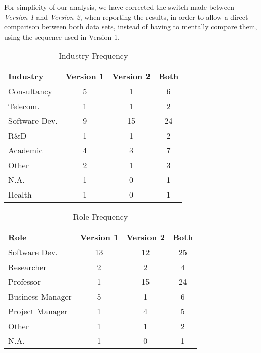 For simplicity of our analysis, we have corrected the switch made between \textit{Version 1} and \textit{Version 2}, when reporting the results, in order to allow a direct comparison between both data sets, instead of having to mentally compare them, using the sequence used in Version 1.

\begin{table}[htb]
	\centering
	\caption{Industry Frequency}
	\label{tab: industry}
	\begin{tabular}{l|c|c|c}
		\hline \bf Industry & \bf Version 1 & \bf Version 2 & \bf Both \\ \hline
		Consultancy         & 5             & 1             & 6        \\ \hline
		Telecom.            & 1             & 1             & 2        \\ \hline
		Software Dev.       & 9             & 15            & 24       \\ \hline
		R\&D                & 1             & 1             & 2        \\ \hline
		Academic            & 4             & 3             & 7        \\ \hline
		Other               & 2             & 1             & 3        \\ \hline
		N.A.                & 1             & 0             & 1        \\ \hline
		Health              & 1             & 0             & 1        \\ \hline
	\end{tabular}
\end{table}

\begin{table}[htb]
	\centering
	\caption{Role Frequency}
	\label{tab: roles}
	\begin{tabular}{l|c|c|c}
		\hline \bf Role  & \bf Version 1 & \bf Version 2 & \bf Both \\ \hline
		Software Dev.    & 13            & 12            & 25       \\ \hline
		Researcher       & 2             & 2             & 4        \\ \hline
		Professor        & 1             & 15            & 24       \\ \hline
		Business Manager & 5             & 1             & 6        \\ \hline
		Project Manager  & 1             & 4             & 5        \\ \hline
		Other            & 1             & 1             & 2        \\ \hline
		N.A.             & 1             & 0             & 1        \\ \hline
	\end{tabular}
\end{table}

